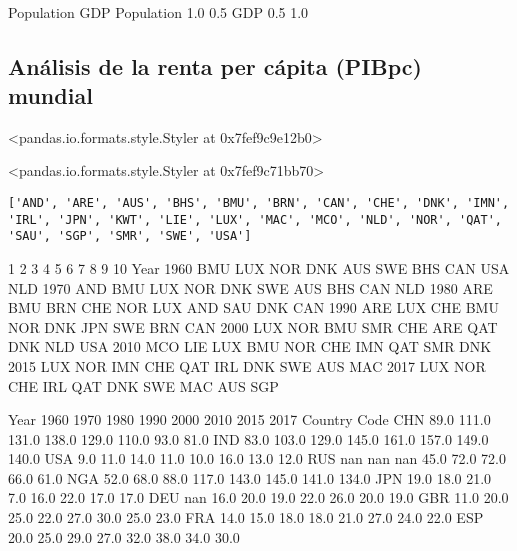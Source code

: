 \documentclass[11pt]{article}
\begin{document}
    \begin{center}
    \end{center}
    { \hspace*{\fill} \\}
    
            Population  GDP
Population         1.0  0.5
GDP                0.5  1.0
            
    \subsection*{Análisis de la renta per cápita (PIBpc)
mundial}\label{anuxe1lisis-de-la-renta-per-cuxe1pita-pibpc-mundial}

<pandas.io.formats.style.Styler at 0x7fef9c9e12b0>
            
<pandas.io.formats.style.Styler at 0x7fef9c71bb70>
            
    \begin{Verbatim}[commandchars=\\\{\}]
['AND', 'ARE', 'AUS', 'BHS', 'BMU', 'BRN', 'CAN', 'CHE', 'DNK', 'IMN', 'IRL', 'JPN', 'KWT', 'LIE', 'LUX', 'MAC', 'MCO', 'NLD', 'NOR', 'QAT', 'SAU', 'SGP', 'SMR', 'SWE', 'USA']

    \end{Verbatim}

       1    2    3    4    5    6    7    8    9    10
Year                                                  
1960  BMU  LUX  NOR  DNK  AUS  SWE  BHS  CAN  USA  NLD
1970  AND  BMU  LUX  NOR  DNK  SWE  AUS  BHS  CAN  NLD
1980  ARE  BMU  BRN  CHE  NOR  LUX  AND  SAU  DNK  CAN
1990  ARE  LUX  CHE  BMU  NOR  DNK  JPN  SWE  BRN  CAN
2000  LUX  NOR  BMU  SMR  CHE  ARE  QAT  DNK  NLD  USA
2010  MCO  LIE  LUX  BMU  NOR  CHE  IMN  QAT  SMR  DNK
2015  LUX  NOR  IMN  CHE  QAT  IRL  DNK  SWE  AUS  MAC
2017  LUX  NOR  CHE  IRL  QAT  DNK  SWE  MAC  AUS  SGP
            
Year          1960  1970  1980  1990  2000  2010  2015  2017
Country Code                                                
CHN           89.0 111.0 131.0 138.0 129.0 110.0  93.0  81.0
IND           83.0 103.0 129.0 145.0 161.0 157.0 149.0 140.0
USA            9.0  11.0  14.0  11.0  10.0  16.0  13.0  12.0
RUS            nan   nan   nan  45.0  72.0  72.0  66.0  61.0
NGA           52.0  68.0  88.0 117.0 143.0 145.0 141.0 134.0
JPN           19.0  18.0  21.0   7.0  16.0  22.0  17.0  17.0
DEU            nan  16.0  20.0  19.0  22.0  26.0  20.0  19.0
GBR           11.0  20.0  25.0  22.0  27.0  30.0  25.0  23.0
FRA           14.0  15.0  18.0  18.0  21.0  27.0  24.0  22.0
ESP           20.0  25.0  29.0  27.0  32.0  38.0  34.0  30.0
            
\end{document}

